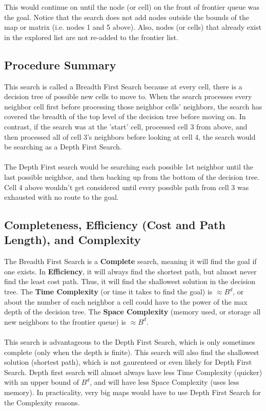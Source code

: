 \documentclass[12pt]{article}
\begin{document}
	This would continue on until the node (or cell) on the front of frontier queue was the goal. Notice that the search does not add nodes outside the bounds of the map or matrix (i.e. nodes 1 and 5 above). Also, nodes (or cells) that already exist in the explored list are not re-added to the frontier list.

	\subsection{Procedure Summary}
	This search is called a Breadth First Search because at every cell, there is a decision tree of possible new cells to move to. When the search processes every neighbor cell first before processing those neighbor cells' neighbors, the search has covered the breadth of the top level of the decision tree before moving on. In contrast, if the search was at the 'start' cell, processed cell 3 from above, and then processed all of cell 3's neighbors before looking at cell 4, the search would be searching as a Depth First Search.
	\\ \\
	The Depth First search would be searching each possible 1st neighbor until the last possible neighbor, and then backing up from the bottom of the decision tree. Cell 4 above wouldn't get considered until every possible path from cell 3 was exhausted with no route to the goal.

	\subsection{Completeness, Efficiency (Cost and Path Length), and Complexity}
	The Breadth First Search is a \textbf{Complete} search, meaning it will find the goal if one exists. In \textbf{Efficiency}, it will always find the shortest path, but almost never find the least cost path.  Thus, it will find the shallowest solution in the decision tree. The \textbf{Time Complexity} (or time it takes to find the goal) is $\approx B^{d}$, or about the number of each neighbor a cell could have to the power of the max depth of the decision tree. The \textbf{Space Complexity} (memory used, or storage all new neighbors to the frontier queue) is $\approx B^{d}$.
	\\ \\
	This search is advantageous to the Depth First Search, which is only sometimes complete (only when the depth is finite). This search will also find the shallowest solution (shortest path), which is not gaurenteed or even likely for Depth First Search. Depth first search will almost always have less Time Complexity (quicker) with an upper bound of $B^{d}$, and will have less Space Complexity (uses less memory). In practicality, very big maps would have to use Depth First Search for the Complexity reasons.
\end{document}
